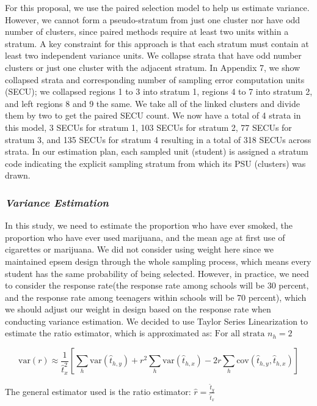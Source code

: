 \documentclass[
  12pt]{article}
\begin{document}
For this proposal, we use the paired selection model to help us estimate
variance. However, we cannot form a pseudo-stratum from just one cluster
nor have odd number of clusters, since paired methods require at least
two units within a stratum. A key constraint for this approach is that
each stratum must contain at least two independent variance units. We
collapse strata that have odd number clusters or just one cluster with
the adjacent stratum. In Appendix 7, we show collapsed strata and
corresponding number of sampling error computation units (SECU); we
collapsed regions 1 to 3 into stratum 1, regions 4 to 7 into stratum 2,
and left regions 8 and 9 the same. We take all of the linked clusters
and divide them by two to get the paired SECU count. We now have a total
of 4 strata in this model, 3 SECUs for stratum 1, 103 SECUs for stratum
2, 77 SECUs for stratum 3, and 135 SECUs for stratum 4 resulting in a
total of 318 SECUs across strata. In our estimation plan, each sampled
unit (student) is assigned a stratum code indicating the explicit
sampling stratum from which its PSU (clusters) was drawn.

\subsubsection{\texorpdfstring{\emph{Variance
Estimation}}{Variance Estimation}}\label{variance-estimation}

In this study, we need to estimate the proportion who have ever smoked,
the proportion who have ever used marijuana, and the mean age at first
use of cigarettes or marijuana. We did not consider using weight here
since we maintained epsem design through the whole sampling process,
which means every student has the same probability of being selected.
However, in practice, we need to consider the response rate(the response
rate among schools will be 30 percent, and the response rate among
teenagers within schools will be 70 percent), which we should adjust our
weight in design based on the response rate when conducting variance
estimation. We decided to use Taylor Series Linearization to estimate
the ratio estimator, which is approximated as:
\(\text{For all strata } n_h = 2\)

\[
\text{var}(r) \approx \frac{1}{\hat{t}_x^2} \left[ \sum_h \text{var}(\hat{t}_{h,y}) + r^2 \sum_h \text{var}(\hat{t}_{h,x}) - 2r \sum_h \text{cov}(\hat{t}_{h,y}, \hat{t}_{h,x}) \right]
\]

The general estimator used is the ratio estimator:
\(\hat{r} = \frac{\hat{t}_y}{\hat{t}_x}\)
\end{document}
